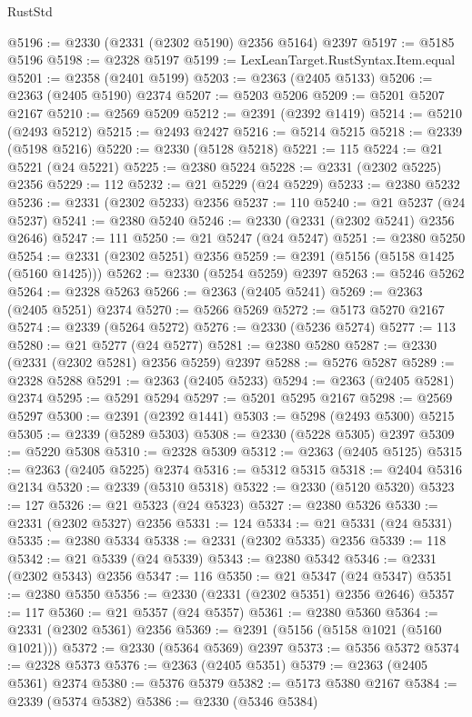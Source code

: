 \begin{lexlean}{RustStd}
\begin{coremodule}
@5196 := @2330 (@2331 (@2302 @5190) @2356 @5164) @2397
@5197 := @5185 @5196
@5198 := @2328 @5197
@5199 := LexLeanTarget.RustSyntax.Item.equal
@5201 := @2358 (@2401 @5199)
@5203 := @2363 (@2405 @5133)
@5206 := @2363 (@2405 @5190) @2374
@5207 := @5203 @5206
@5209 := @5201 @5207 @2167
@5210 := @2569 @5209
@5212 := @2391 (@2392 @1419)
@5214 := @5210 (@2493 @5212)
@5215 := @2493 @2427
@5216 := @5214 @5215
@5218 := @2339 (@5198 @5216)
@5220 := @2330 (@5128 @5218)
@5221 := 115
@5224 := @21 @5221 (@24 @5221)
@5225 := @2380 @5224
@5228 := @2331 (@2302 @5225) @2356
@5229 := 112
@5232 := @21 @5229 (@24 @5229)
@5233 := @2380 @5232
@5236 := @2331 (@2302 @5233) @2356
@5237 := 110
@5240 := @21 @5237 (@24 @5237)
@5241 := @2380 @5240
@5246 := @2330 (@2331 (@2302 @5241) @2356 @2646)
@5247 := 111
@5250 := @21 @5247 (@24 @5247)
@5251 := @2380 @5250
@5254 := @2331 (@2302 @5251) @2356
@5259 := @2391 (@5156 (@5158 @1425 (@5160 @1425)))
@5262 := @2330 (@5254 @5259) @2397
@5263 := @5246 @5262
@5264 := @2328 @5263
@5266 := @2363 (@2405 @5241)
@5269 := @2363 (@2405 @5251) @2374
@5270 := @5266 @5269
@5272 := @5173 @5270 @2167
@5274 := @2339 (@5264 @5272)
@5276 := @2330 (@5236 @5274)
@5277 := 113
@5280 := @21 @5277 (@24 @5277)
@5281 := @2380 @5280
@5287 := @2330 (@2331 (@2302 @5281) @2356 @5259) @2397
@5288 := @5276 @5287
@5289 := @2328 @5288
@5291 := @2363 (@2405 @5233)
@5294 := @2363 (@2405 @5281) @2374
@5295 := @5291 @5294
@5297 := @5201 @5295 @2167
@5298 := @2569 @5297
@5300 := @2391 (@2392 @1441)
@5303 := @5298 (@2493 @5300) @5215
@5305 := @2339 (@5289 @5303)
@5308 := @2330 (@5228 @5305) @2397
@5309 := @5220 @5308
@5310 := @2328 @5309
@5312 := @2363 (@2405 @5125)
@5315 := @2363 (@2405 @5225) @2374
@5316 := @5312 @5315
@5318 := @2404 @5316 @2134
@5320 := @2339 (@5310 @5318)
@5322 := @2330 (@5120 @5320)
@5323 := 127
@5326 := @21 @5323 (@24 @5323)
@5327 := @2380 @5326
@5330 := @2331 (@2302 @5327) @2356
@5331 := 124
@5334 := @21 @5331 (@24 @5331)
@5335 := @2380 @5334
@5338 := @2331 (@2302 @5335) @2356
@5339 := 118
@5342 := @21 @5339 (@24 @5339)
@5343 := @2380 @5342
@5346 := @2331 (@2302 @5343) @2356
@5347 := 116
@5350 := @21 @5347 (@24 @5347)
@5351 := @2380 @5350
@5356 := @2330 (@2331 (@2302 @5351) @2356 @2646)
@5357 := 117
@5360 := @21 @5357 (@24 @5357)
@5361 := @2380 @5360
@5364 := @2331 (@2302 @5361) @2356
@5369 := @2391 (@5156 (@5158 @1021 (@5160 @1021)))
@5372 := @2330 (@5364 @5369) @2397
@5373 := @5356 @5372
@5374 := @2328 @5373
@5376 := @2363 (@2405 @5351)
@5379 := @2363 (@2405 @5361) @2374
@5380 := @5376 @5379
@5382 := @5173 @5380 @2167
@5384 := @2339 (@5374 @5382)
@5386 := @2330 (@5346 @5384)

\end{coremodule}
\end{lexlean}
